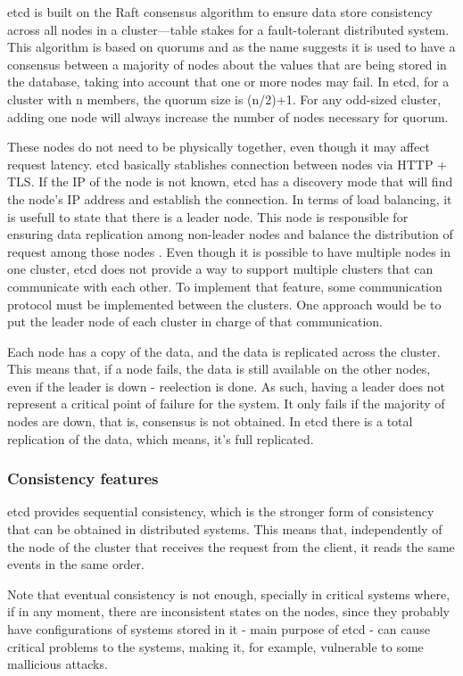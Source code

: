 \documentclass[screen,review]{acmart}
\begin{document}
etcd is built on the Raft consensus algorithm \cite{raft} to ensure data store consistency across all nodes in a cluster—table stakes for a fault-tolerant distributed system. This algorithm is based on quorums and as the name suggests it is used to have a consensus between a majority of nodes about the values that are being stored in the database, taking into account that one or more nodes may fail. In etcd, for a cluster with n members, the quorum size is (n/2)+1. For any odd-sized cluster, adding one node will always increase the number of nodes necessary for quorum.

These nodes do not need to be physically together, even though it may affect request latency. etcd basically stablishes connection between nodes via HTTP + TLS. If the IP of the node is not known, etcd has a discovery mode that will find the node's IP address and establish the connection.
In terms of load balancing, it is usefull to state that there is a leader node. This node is responsible for ensuring data replication among non-leader nodes and balance the distribution of request among those nodes \cite{etcd_faq}.
Even though it is possible to have multiple nodes in one cluster, etcd does not provide a way to support multiple clusters that can communicate with each other. To implement that feature, some communication protocol must be implemented between the clusters. One approach would be to put the leader node of each cluster in charge of that communication.

Each node has a copy of the data, and the data is replicated across the cluster. This means that, if a node fails, the data is still available on the other nodes, even if the leader is down - reelection is done. As such, having a leader does not represent a critical point of failure for the system. It only fails if the majority of nodes are down, that is, consensus is not obtained.
In etcd there is a total replication of the data, which means, it's full replicated.

\subsubsection{Consistency features}
etcd provides sequential consistency, which is the stronger form of consistency that can be obtained in distributed systems. This means that, independently of the node of the cluster that receives the request from the client, it reads the same events in the same order.

Note that eventual consistency is not enough, specially in critical systems where, if in any moment, there are inconsistent states on the nodes, since they probably have configurations of systems stored in it - main purpose of etcd - can cause critical problems to the systems, making it, for example, vulnerable to some mallicious attacks.
\end{document}
